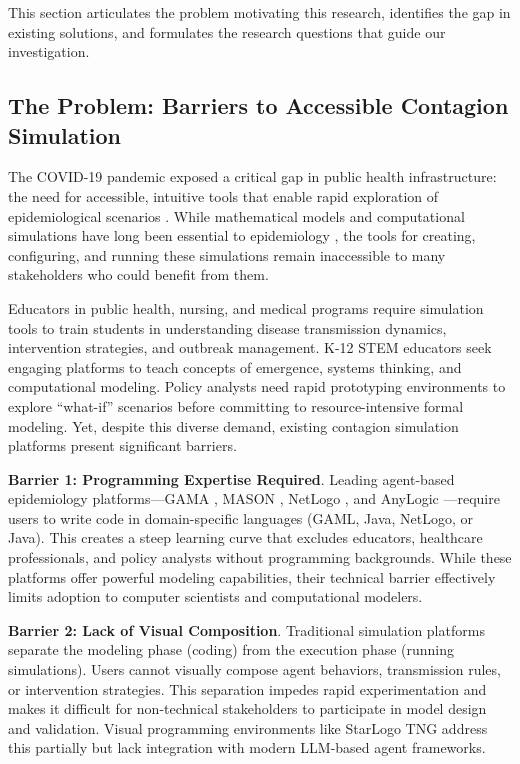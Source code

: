 \label{sec:problem}

This section articulates the problem motivating this research, identifies the gap in existing solutions, and formulates the research questions that guide our investigation.

\subsection{The Problem: Barriers to Accessible Contagion Simulation}

The COVID-19 pandemic exposed a critical gap in public health infrastructure: the need for accessible, intuitive tools that enable rapid exploration of epidemiological scenarios \cite{who2020pandemic}. While mathematical models and computational simulations have long been essential to epidemiology \cite{anderson1992infectious}, the tools for creating, configuring, and running these simulations remain inaccessible to many stakeholders who could benefit from them.

Educators in public health, nursing, and medical programs require simulation tools to train students in understanding disease transmission dynamics, intervention strategies, and outbreak management. K-12 STEM educators seek engaging platforms to teach concepts of emergence, systems thinking, and computational modeling. Policy analysts need rapid prototyping environments to explore ``what-if'' scenarios before committing to resource-intensive formal modeling. Yet, despite this diverse demand, existing contagion simulation platforms present significant barriers.

\textbf{Barrier 1: Programming Expertise Required}. Leading agent-based epidemiology platforms---GAMA \cite{grignard2013gama}, MASON \cite{luke2005mason}, NetLogo \cite{wilensky1999netlogo}, and AnyLogic \cite{borshchev2013anylogic}---require users to write code in domain-specific languages (GAML, Java, NetLogo, or Java). This creates a steep learning curve that excludes educators, healthcare professionals, and policy analysts without programming backgrounds. While these platforms offer powerful modeling capabilities, their technical barrier effectively limits adoption to computer scientists and computational modelers.

\textbf{Barrier 2: Lack of Visual Composition}. Traditional simulation platforms separate the modeling phase (coding) from the execution phase (running simulations). Users cannot visually compose agent behaviors, transmission rules, or intervention strategies. This separation impedes rapid experimentation and makes it difficult for non-technical stakeholders to participate in model design and validation. Visual programming environments like StarLogo TNG \cite{robertson2007starlogo} address this partially but lack integration with modern LLM-based agent frameworks.


